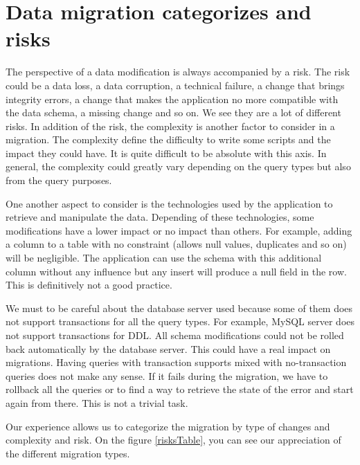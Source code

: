 \section{Data migration categorizes and risks}
	\label{sec:risks}

The perspective of a data modification is always accompanied by a risk. The risk could be a data loss, a data corruption, a technical failure, a change that brings integrity errors, a change that makes the application no more compatible with the data schema, a missing change and so on. We see they are a lot of different risks. In addition of the risk, the complexity is another factor to consider in a migration. The complexity define the difficulty to write some scripts and the impact they could have. It is quite difficult to be absolute with this axis. In general, the complexity could greatly vary depending on the query types but also from the query purposes.

One another aspect to consider is the technologies used by the application to retrieve and manipulate the data. Depending of these technologies, some modifications have a lower impact or no impact than others. For example, adding a column to a table with no constraint (allows null values, duplicates and so on) will be negligible. The application can use the schema with this additional column without any influence but any insert will produce a null field in the row. This is definitively not a good practice.

We must to be careful about the database server used because some of them does not support transactions for all the query types. For example, MySQL\cite{mysql} server does not support transactions for DDL\cite{ddl}. All schema modifications could not be rolled back automatically by the database server. This could have a real impact on migrations. Having queries with transaction supports mixed with no-transaction queries does not make any sense. If it fails during the migration, we have to rollback all the queries or to find a way to retrieve the state of the error and start again from there. This is not a trivial task.

Our experience allows us to categorize the migration by type of changes and complexity and risk. On the figure \ref{risksTable}, you can see our appreciation of the different migration types.

